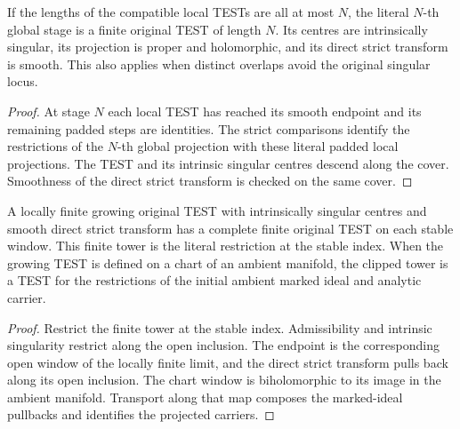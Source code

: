 \begin{corollary}
\label{hir:g8-bounded-open-test-endpoint}
\leanok
If the lengths of the compatible local TESTs are all at most \(N\),
the literal \(N\)-th global stage is a finite original TEST of length
\(N\). Its centres are intrinsically singular, its projection is proper
and holomorphic, and its direct strict transform is smooth. This also
applies when distinct overlaps avoid the original singular locus.
\end{corollary}
\begin{proof}
At stage \(N\) each local TEST has reached its smooth endpoint
and its remaining padded steps are identities. The strict comparisons
identify the restrictions of the \(N\)-th global projection with
these literal padded local projections. The TEST and its intrinsic
singular centres descend along the cover. Smoothness of the
direct strict transform is checked on the same cover.
\end{proof}

\begin{proposition}
\label{hir:g8-growing-stable-window-test}
\leanok
A locally finite growing original TEST with intrinsically singular
centres and smooth direct strict transform has a complete finite
original TEST on each stable window. This finite tower is the
literal restriction at the stable index. When the growing TEST is
defined on a chart of an ambient manifold, the clipped tower is a
TEST for the restrictions of the initial ambient marked ideal and
analytic carrier.
\end{proposition}
\begin{proof}
Restrict the finite tower at the stable index. Admissibility and
intrinsic singularity restrict along the open inclusion. The endpoint
is the corresponding open window of the locally finite limit, and
the direct strict transform pulls back along its open inclusion.
The chart window is biholomorphic to its image in the ambient
manifold. Transport along that map composes the marked-ideal
pullbacks and identifies the projected carriers.
\end{proof}

